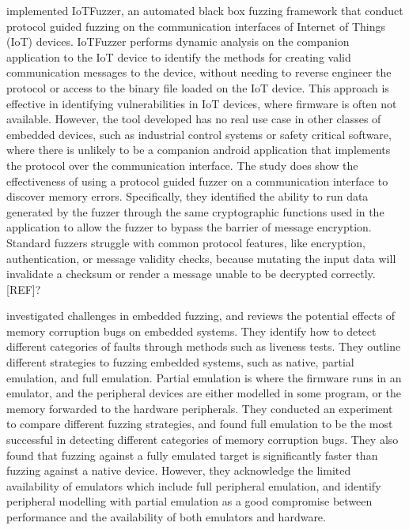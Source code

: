 \documentclass[../report.tex]{subfiles}
\begin{document}
\citet{IOTFuzzer_2018} implemented IoTFuzzer, an automated black box fuzzing
framework that conduct protocol guided fuzzing on the communication interfaces
of Internet of Things (IoT) devices. IoTFuzzer performs dynamic analysis on the companion
application to the IoT device to identify the methods for creating valid
communication messages to the device, without needing to reverse engineer the
protocol or access to the binary file loaded on the IoT device. This approach
is effective in identifying vulnerabilities in IoT devices, where firmware is
often not available. However, the tool developed has no real use case in other
classes of embedded devices, such as industrial control systems or safety
critical software, where there is unlikely to be a companion android
application that implements the protocol over the communication interface.
The study does show the effectiveness of using a protocol guided
fuzzer on a communication interface to discover memory errors. Specifically,
they identified the ability to run data generated by the fuzzer through the same
cryptographic functions used in the application to allow the fuzzer to bypass
the barrier of message encryption. Standard fuzzers struggle with common
protocol features, like encryption, authentication, or message validity checks,
because mutating the input data will invalidate a checksum or render a message
unable to be decrypted correctly. [REF]?

\citet{Muench_2018} investigated challenges in embedded fuzzing, and reviews
the potential effects of memory corruption bugs on embedded systems.
They identify how to detect different categories of faults through methods such
as liveness tests. They outline different strategies to fuzzing embedded
systems, such as native, partial emulation, and full emulation. Partial
emulation is where the firmware runs in an emulator, and the peripheral devices
are either modelled in some program, or the memory forwarded to the hardware
peripherals. They conducted an experiment to compare different fuzzing
strategies, and found full emulation to be the most successful in detecting
different categories of memory corruption bugs. They also found that fuzzing
against a fully emulated target is significantly faster than fuzzing against a
native device. However, they acknowledge the limited availability of emulators
which include full peripheral emulation, and identify peripheral modelling with
partial emulation as a good compromise between performance and the availability
of both emulators and hardware.
\end{document}
